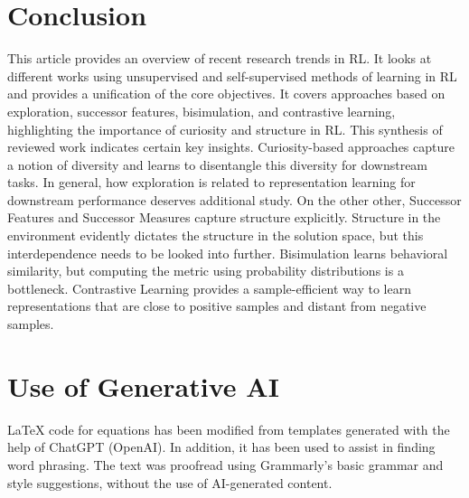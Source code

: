 \documentclass{article}
\begin{document}
\section{Conclusion}

This article provides an overview of recent research trends in RL. It looks at different works using unsupervised and self-supervised methods of learning in RL and provides a unification of the core objectives. It covers approaches based on exploration, successor features, bisimulation, and contrastive learning, highlighting the importance of curiosity and structure in RL. This synthesis of reviewed work indicates certain key insights. Curiosity-based approaches capture a notion of diversity and learns to disentangle this diversity for downstream tasks. In general, how exploration is related to representation learning for downstream performance deserves additional study. On the other other, Successor Features and Successor Measures capture structure explicitly. Structure in the environment evidently dictates the structure in the solution space, but this interdependence needs to be looked into further. Bisimulation learns behavioral similarity, but computing the metric using probability distributions is a bottleneck. Contrastive Learning provides a sample-efficient way to learn representations that are close to positive samples and distant from negative samples. 



\section{Use of Generative AI}
LaTeX code for equations has been modified from templates generated with the help of ChatGPT (OpenAI). In addition, it has been used to assist in finding word phrasing. The text was proofread using Grammarly’s basic grammar and style suggestions, without the use of AI-generated content. 
\end{document}

